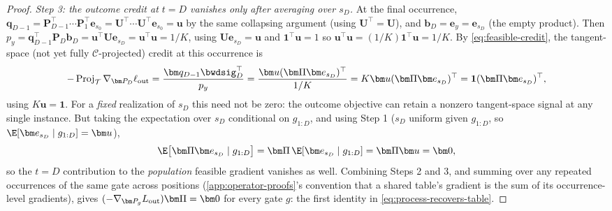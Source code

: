 \begin{proof}
\emph{Step 3: the outcome credit at $t=D$ vanishes only after averaging over
$s_D$.} At the final occurrence, $\bm q_{D-1}=\bm P_{D-1}^\top\cdots\bm P_1^\top\bm e_{s_0}=\bm U^\top\cdots\bm U^\top\bm e_{s_0}=\bm u$
by the same collapsing argument (using $\bm U^\top=\bm U$), and
$\bm b_D=\bm e_y=\bm e_{s_D}$ (the empty product). Then
$p_y=\bm q_{D-1}^\top\bm P_D\bm b_D=\bm u^\top\bm U\bm e_{s_D}=\bm u^\top\bm u=1/K$,
using $\bm U\bm e_{s_D}=\bm u$ and $\mathbf1^\top\bm u=1$ so
$\bm u^\top\bm u=(1/K)\mathbf1^\top\bm u=1/K$. By \cref{eq:feasible-credit},
the tangent-space (not yet fully $\mathcal C$-projected) credit at this
occurrence is
\[
 -\operatorname{Proj}_{\mathcal T}\nabla_{\bm P_D}\ell_{\rm out}
 =\frac{\bm q_{D-1}\bwdsig_D^\top}{p_y}
 =\frac{\bm u(\bm\Pi\bm e_{s_D})^\top}{1/K}
 =K\bm u(\bm\Pi\bm e_{s_D})^\top
 =\mathbf1(\bm\Pi\bm e_{s_D})^\top,
\]
using $K\bm u=\mathbf1$. For a \emph{fixed} realization of $s_D$ this need
not be zero: the outcome objective can retain a nonzero tangent-space
signal at any single instance. But taking the expectation over $s_D$
conditional on $g_{1:D}$, and using Step 1 ($s_D$ uniform given $g_{1:D}$,
so $\E[\bm e_{s_D}\mid g_{1:D}]=\bm u$),
\[
 \E\bigl[\bm\Pi\bm e_{s_D}\mid g_{1:D}\bigr]=\bm\Pi\,\E[\bm e_{s_D}\mid g_{1:D}]=\bm\Pi\bm u=\bm0,
\]
so the $t=D$ contribution to the \emph{population} feasible gradient
vanishes as well. Combining Steps 2 and 3, and summing over any repeated
occurrences of the same gate across positions (\cref{app:operator-proofs}'s
convention that a shared table's gradient is the sum of its occurrence-level
gradients), gives $(-\nabla_{\bm P_g}L_{\rm out})\bm\Pi=\bm0$ for every gate
$g$: the first identity in \cref{eq:process-recovers-table}.


\end{proof}
